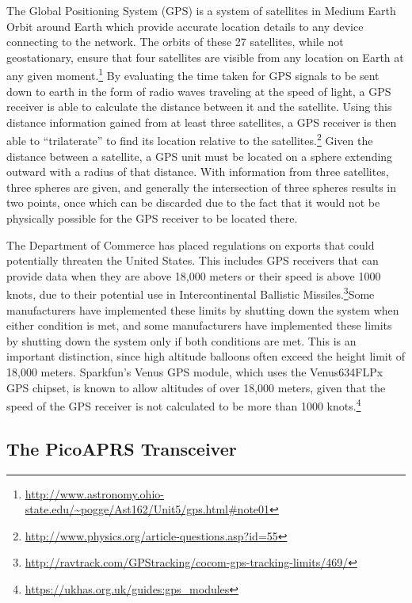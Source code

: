 \documentclass[12pt,]{article}
\let\rmarkdownfootnote\footnote%
\def\footnote{\protect\rmarkdownfootnote}
\begin{document}
The Global Positioning System (GPS) is a system of satellites in Medium
Earth Orbit around Earth which provide accurate location details to any
device connecting to the network. The orbits of these 27 satellites,
while not geostationary, ensure that four satellites are visible from
any location on Earth at any given moment.\footnote{\url{http://www.astronomy.ohio-state.edu/~pogge/Ast162/Unit5/gps.html\#note01}}
By evaluating the time taken for GPS signals to be sent down to earth in
the form of radio waves traveling at the speed of light, a GPS receiver
is able to calculate the distance between it and the satellite. Using
this distance information gained from at least three satellites, a GPS
receiver is then able to ``trilaterate'' to find its location relative
to the satellites.\footnote{\url{http://www.physics.org/article-questions.asp?id=55}}
Given the distance between a satellite, a GPS unit must be located on a
sphere extending outward with a radius of that distance. With
information from three satellites, three spheres are given, and
generally the intersection of three spheres results in two points, once
which can be discarded due to the fact that it would not be physically
possible for the GPS receiver to be located there.

The Department of Commerce has placed regulations on exports that could
potentially threaten the United States. This includes GPS receivers that
can provide data when they are above 18,000 meters or their speed is
above 1000 knots, due to their potential use in Intercontinental
Ballistic Missiles.\footnote{\url{http://ravtrack.com/GPStracking/cocom-gps-tracking-limits/469/}}Some
manufacturers have implemented these limits by shutting down the system
when either condition is met, and some manufacturers have implemented
these limits by shutting down the system only if both conditions are
met. This is an important distinction, since high altitude balloons
often exceed the height limit of 18,000 meters. Sparkfun's Venus GPS
module, which uses the Venus634FLPx GPS chipset, is known to allow
altitudes of over 18,000 meters, given that the speed of the GPS
receiver is not calculated to be more than 1000 knots.\footnote{\url{https://ukhas.org.uk/guides:gps_modules}}

\subsection{The PicoAPRS Transceiver}\label{the-picoaprs-transceiver}
\end{document}
